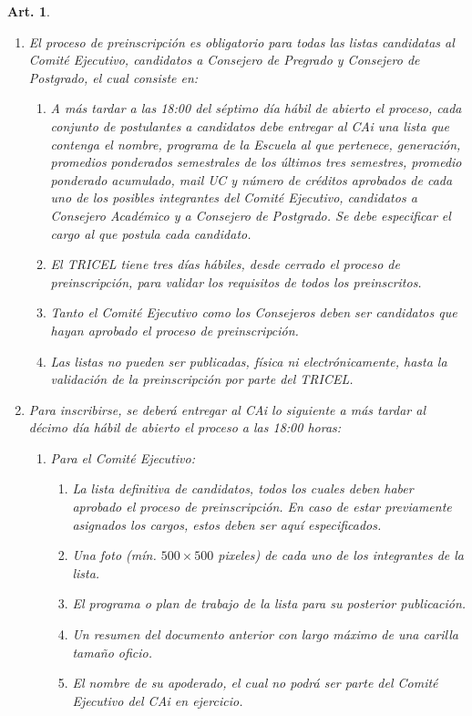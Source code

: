 \documentclass[letterpaper,11pt]{article}
\theoremstyle{plain}
\newtheorem{art}{Art.} %
\begin{document}
\begin{art}
\begin{enumerate}
				\item El proceso de preinscripción es obligatorio para todas las listas candidatas al Comité Ejecutivo, candidatos a Consejero de Pregrado y Consejero de Postgrado, el cual consiste en:
					\begin{enumerate}
						\item A más tardar a las 18:00 del séptimo día hábil de abierto el proceso, cada conjunto
						de postulantes a candidatos debe entregar al CAi una lista que contenga el nombre, programa de la Escuela al que pertenece, generación, promedios ponderados semestrales de los últimos tres semestres, promedio ponderado acumulado, mail UC y número de créditos aprobados de cada uno de los posibles integrantes del Comité Ejecutivo, candidatos a Consejero Académico y a Consejero de Postgrado. Se debe especificar el cargo al que postula cada candidato. 

						\item El TRICEL tiene tres días hábiles, desde cerrado el proceso de preinscripción, para validar los requisitos de todos los preinscritos.
						
						\item Tanto el Comité Ejecutivo como los Consejeros deben ser candidatos que hayan aprobado el proceso de preinscripción.
						
						\item Las listas no pueden ser publicadas, física ni electrónicamente, hasta la validación de la preinscripción por parte del TRICEL.
					\end{enumerate}

				\item Para inscribirse, se deberá entregar al CAi lo siguiente a más tardar al décimo día hábil de abierto el proceso a las 18:00 horas:
					\begin{enumerate}
						\item Para el Comité Ejecutivo:
							\begin{enumerate}
								\item La lista definitiva de candidatos, todos los cuales deben haber aprobado el proceso de preinscripción. En caso de estar previamente asignados los cargos, estos deben ser aquí especificados.
								\item\label{foto} Una foto (mín. $500 \times 500$ pixeles) de cada uno de los integrantes de la lista. 
								\item El programa o plan de trabajo de la lista para su posterior publicación.
								\item Un resumen del documento anterior con largo máximo de una carilla tamaño oficio.
								\item El nombre de su apoderado, el cual no podrá ser parte del Comité Ejecutivo del CAi en ejercicio.
							\end{enumerate}


\end{enumerate}
\end{enumerate}
\end{art}
\end{document}
